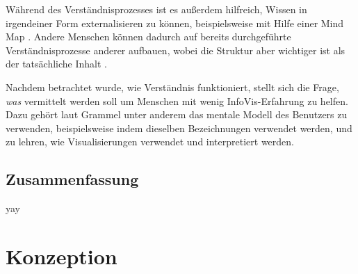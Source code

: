 \documentclass[
	headsepline,
	footsepline,
	fontsize=12pt,
	bibliography=totoc
]{scrbook}
\begin{document}

Während des Verständnisprozesses ist es außerdem hilfreich, Wissen in irgendeiner Form externalisieren zu können, beispielsweise mit Hilfe einer Mind Map \cite{Qu2005, Novak2007, Umapathy2010}. Andere Menschen können dadurch auf bereits durchgeführte Verständnisprozesse anderer aufbauen, wobei die Struktur aber wichtiger ist als der tatsächliche Inhalt \cite{Fisher2012}.

Nachdem betrachtet wurde, wie Verständnis funktioniert, stellt sich die Frage, \emph{was} vermittelt werden soll um Menschen mit wenig InfoVis-Erfahrung zu helfen. Dazu gehört laut Grammel \cite[S. 127]{Grammel2012} unter anderem das mentale Modell des Benutzers zu verwenden, beispielsweise indem dieselben Bezeichnungen verwendet werden, und zu lehren, wie Visualisierungen verwendet und interpretiert werden.

\section{Zusammenfassung}
\label{section:grundlagen_zusammenfassung}

yay

\chapter{Konzeption}
\label{chapter:konzeption}


\printbibliography[title=Literaturverzeichnis]

\end{document}

